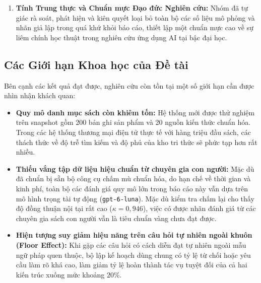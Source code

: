 \begin{enumerate}
    \item \textbf{Tính Trung thực và Chuẩn mực Đạo đức Nghiên cứu:} Nhóm đã tự giác rà soát, phát hiện và kiên quyết loại bỏ toàn bộ các số liệu mô phỏng và nhãn giả lập trong quá khứ khỏi báo cáo, thiết lập một chuẩn mực cao về sự liêm chính học thuật trong nghiên cứu ứng dụng AI tại bậc đại học.
\end{enumerate}

\subsection{Các Giới hạn Khoa học của Đề tài}
Bên cạnh các kết quả đạt được, nghiên cứu còn tồn tại một số giới hạn cần được nhìn nhận khách quan:
\begin{itemize}
    \item \textbf{Quy mô danh mục sách còn khiêm tốn:} Hệ thống mới được thử nghiệm trên snapshot gồm 200 bản ghi sản phẩm và 20 nguồn kiến thức chuẩn hóa. Trong các hệ thống thương mại điện tử thực tế với hàng triệu đầu sách, các thách thức về độ trễ tìm kiếm và độ phủ của kho tri thức sẽ phức tạp hơn rất nhiều.
    \item \textbf{Thiếu vắng tập dữ liệu hiệu chuẩn từ chuyên gia con người:} Mặc dù đã chuẩn bị sẵn bộ công cụ chấm mù chuẩn hóa, do hạn chế về thời gian và kinh phí, toàn bộ các đánh giá quy mô lớn trong báo cáo này vẫn dựa trên mô hình trọng tài tự động (\texttt{gpt-6-luna}). Mặc dù kiểm tra chấm lại cho thấy độ đồng thuận nội tại rất cao ($\kappa = 0{,}946$), việc có được nhãn đánh giá từ các chuyên gia sách con người vẫn là tiêu chuẩn vàng chưa đạt được.
    \item \textbf{Hiện tượng suy giảm hiệu năng trên câu hỏi tự nhiên ngoài khuôn (Floor Effect):} Khi gặp các câu hỏi có cách diễn đạt tự nhiên ngoài mẫu ngữ pháp quen thuộc, bộ lập kế hoạch dùng chung có tỷ lệ từ chối hoặc yêu cầu làm rõ khá cao, làm giảm tỷ lệ hoàn thành tác vụ tuyệt đối của cả hai kiến trúc xuống mức khoảng $20\%$.
\end{itemize}

